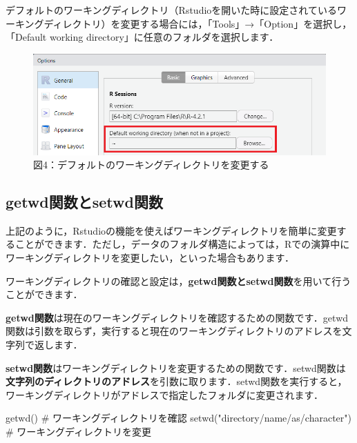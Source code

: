 \documentclass[
  letterpaper,
  DIV=11,
  numbers=noendperiod]{scrreprt}
\newenvironment{Shaded}{\begin{snugshade}}{\end{snugshade}}
\newcommand{\CommentTok}[1]{\textcolor[rgb]{0.37,0.37,0.37}{#1}}
\newcommand{\FunctionTok}[1]{\textcolor[rgb]{0.28,0.35,0.67}{#1}}
\newcommand{\NormalTok}[1]{\textcolor[rgb]{0.00,0.23,0.31}{#1}}
\newcommand{\StringTok}[1]{\textcolor[rgb]{0.13,0.47,0.30}{#1}}
\begin{document}
デフォルトのワーキングディレクトリ（Rstudioを開いた時に設定されているワーキングディレクトリ）を変更する場合には，「Tools」→「Option」を選択し，「Default
working directory」に任意のフォルダを選択します．

\begin{figure}

{\centering \includegraphics{././image/DefaultWD.png}

}

\caption{図4：デフォルトのワーキングディレクトリを変更する}

\end{figure}

\hypertarget{getwdux95a2ux6570ux3068setwdux95a2ux6570}{%
\subsection{getwd関数とsetwd関数}\label{getwdux95a2ux6570ux3068setwdux95a2ux6570}}

上記のように，Rstudioの機能を使えばワーキングディレクトリを簡単に変更することができます．ただし，データのフォルダ構造によっては，Rでの演算中にワーキングディレクトリを変更したい，といった場合もあります．

ワーキングディレクトリの確認と設定は，\textbf{getwd関数とsetwd関数}を用いて行うことができます．

\textbf{getwd関数}は現在のワーキングディレクトリを確認するための関数です．getwd関数は引数を取らず，実行すると現在のワーキングディレクトリのアドレスを文字列で返します．

\textbf{setwd関数}はワーキングディレクトリを変更するための関数です．setwd関数は\textbf{文字列のディレクトリのアドレス}を引数に取ります．setwd関数を実行すると，ワーキングディレクトリがアドレスで指定したフォルダに変更されます．

\begin{Shaded}
\begin{Highlighting}[]
\FunctionTok{getwd}\NormalTok{() }\CommentTok{\# ワーキングディレクトリを確認}
\FunctionTok{setwd}\NormalTok{(}\StringTok{"directory/name/as/character"}\NormalTok{) }\CommentTok{\# ワーキングディレクトリを変更}
\end{Highlighting}
\end{Shaded}
\end{document}
